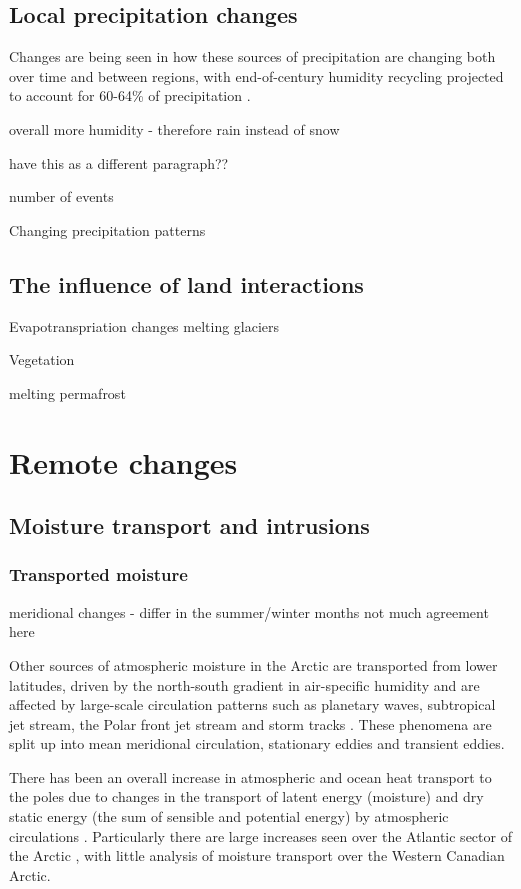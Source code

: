 \documentclass[11pt, oneside]{article}
\begin{document}
\subsection{Local precipitation changes}
Changes are being seen in how these sources of precipitation are changing both over time and between regions, with end-of-century humidity recycling projected to account for 60-64\% of precipitation \cite{ford2022arctic}.

overall more humidity - therefore rain instead of snow 

have this as a different paragraph??

number of events 

Changing precipitation patterns


\subsection{The influence of land interactions}
Evapotranspriation changes 
melting glaciers 

Vegetation

melting permafrost 


\section{Remote changes}
\subsection{Moisture transport and intrusions}


\subsubsection{Transported moisture}

meridional changes - differ in the summer/winter months
not much agreement here 


Other sources of atmospheric moisture in the Arctic are transported from lower latitudes, driven by the north-south gradient in air-specific humidity and are affected by large-scale circulation patterns such as planetary waves, subtropical jet stream, the Polar front jet stream and storm tracks \cite{gimeno2019atmospheric}. These phenomena are split up into mean meridional circulation, stationary eddies and transient eddies. 

There has been an overall increase in atmospheric and ocean heat transport to the poles due to changes in the transport of latent energy (moisture) and dry static energy (the sum of sensible and potential energy) by atmospheric circulations \cite{mcgraw2020changes}. Particularly there are large increases seen over the Atlantic sector of the Arctic \cite{dufour2016atmospheric}, with little analysis of moisture transport over the Western Canadian Arctic. 
\end{document}
